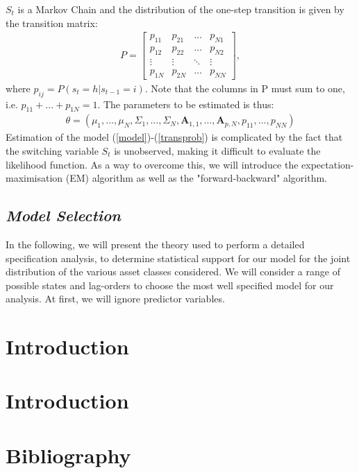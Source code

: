 \documentclass[11pt,a4paper,oneside]{article}
\newcommand{\aaa}{\mathbf{A}}
\begin{document}
$S_t$ is a Markov Chain and the distribution of the one-step transition is given by the transition matrix:
\begin{align}\label{transprob}
 P=\begin{bmatrix}
    p_{11} & p_{21}  & \dots  & p_{N1} \\
    p_{12} & p_{22}  & \dots  & p_{N2} \\
    \vdots & \vdots  & \ddots & \vdots \\
    p_{1N} & p_{2N}  & \dots  & p_{NN}
\end{bmatrix},
\end{align}
where $p_{ij}=P(s_t=h \vert s_{t-1}=i)$. Note that the columns in P must sum to one, i.e. $p_{11}+...+p_{1N}=1$.  The parameters to be estimated is thus:
\begin{align}\label{paramest}
\theta=(\mu_1,...,\mu_N,{\Sigma_1},...,{\Sigma_N}, \aaa_{1,1},...,\aaa_{p,N}, p_{11},...,p_{NN})  
\end{align}
Estimation of the model (\ref{model})-(\ref{transprob}) is complicated by the fact that the switching variable $S_t$ is unobserved, making it difficult to evaluate the likelihood function. As a way to overcome this, we will introduce the expectation-maximisation (EM) algorithm as well as the "forward-backward" algorithm.    

\subsection{\textit{Model Selection}}
\noindent In the following, we will present the theory used to perform a detailed specification analysis, to determine statistical support for our model for the joint distribution of the various asset classes considered. We will consider a range of possible states and lag-orders to choose the most well specified model for our analysis. At first, we will ignore predictor variables.  



\section{Introduction}

\section{Introduction}


\section{Bibliography}
\printbibliography[heading=none]
\end{document}
